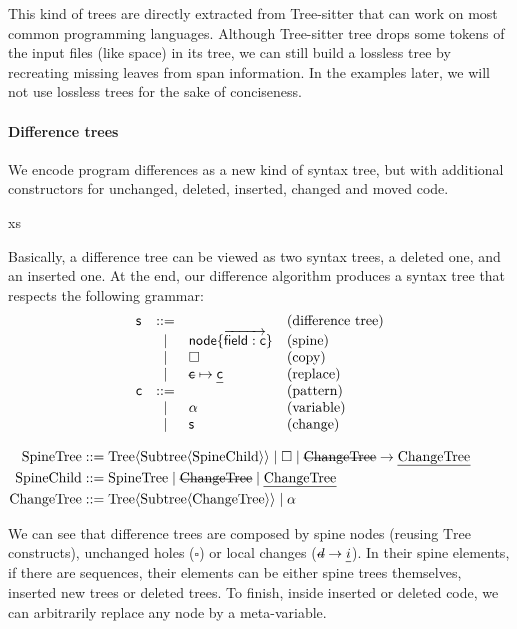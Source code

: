 \documentclass[a4paper,11pt]{article}
\newcommand\typsep{\mathrel{|}}
\newcommand\typ[1]{\mathrm{#1}}
\newcommand\typarg[2]{\typ{#1}\langle#2\rangle}
\newenvironment{typgrammar}{
\par\vspace{0.5em}\centering
$\displaystyle\begin{aligned}}{\end{aligned}
$\par\vspace{0.5em}}
\newcommand\del[1]{\text{\st{$#1$}}}
\newcommand\ins[1]{\text{\ul{$#1$}}}
\newcommand\id{\square}
\newcommand\change[2]{\del{#1} \rightarrow \ins{#2}}
\begin{document}
This kind of trees are directly extracted from Tree-sitter that can work on
most common programming languages. Although Tree-sitter tree drops some tokens
of the input files (like space) in its tree, we can still build a lossless tree
by recreating missing leaves from span information.
In the examples later, we will not use lossless trees for the sake of
conciseness.

\paragraph{Difference trees}
We encode program differences as a new kind of syntax tree, but with additional
constructors for unchanged, deleted, inserted, changed and moved code.

\newcommand{\aSpine}{\ensuremath{\mathsf{s}}}
\newcommand{\aCTree}{\ensuremath{\mathsf{c}}}
\newcommand{\aVar}{\ensuremath{\alpha}}
\newcommand{\defCopy}{\ensuremath{\square}}
\newcommand{\defIdent}[2]{\defNode{#1}{#2}}
\newcommand{\defReplace}[2]{\del{#1} \mapsto \ins{#2}}xs

Basically, a difference tree can be viewed as two syntax trees, a deleted one, and
an
inserted one.
At the end, our difference algorithm produces a syntax tree that respects the
following grammar:
%
\[\begin{array}{lcll}
\aSpine & ::= & & \text{(difference tree)} \\
        & |   & \defIdent{\aNode}{\many{\defField{\aField}{\aCTree}}} & \text{(spine)} \\
        & |   & \defCopy & \text{(copy)} \\
        & |   & \defReplace \aCTree \aCTree & \text{(replace)} \\
\aCTree & ::= & & \text{(pattern)} \\
        & |   & \aVar & \text{(variable)} \\
        & |   & \aSpine & \text{(change)}
\end{array}\]


\begin{typgrammar}
  \typ{SpineTree} &::= \typarg{Tree}{\typarg{Subtree}{\typ{SpineChild}}}
\typsep \id \typsep
\change{\typ{ChangeTree}}{\typ{ChangeTree}}\\
  \typ{SpineChild} &::= \typ{SpineTree} \typsep \del{\typ{ChangeTree}} \typsep
\ins{\typ{ChangeTree}}\\
  \typ{ChangeTree} &::= \typarg{Tree}{\typarg{Subtree}{\typ{ChangeTree}}}
\typsep \alpha\\
\end{typgrammar}
We can see that difference trees are composed by spine nodes (reusing
$\typ{Tree}$
constructs), unchanged holes ($\square$) or local changes ($\change{d}{i}$). In
their spine elements, if there are sequences, their elements can be either
spine trees themselves, inserted new trees or deleted trees. To finish,
inside inserted or deleted code, we can arbitrarily replace any node by a
meta-variable.
\end{document}
